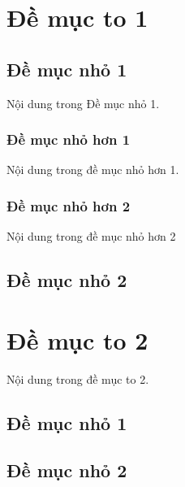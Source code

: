\documentclass[12pt]{article}
\begin{document}
    \tableofcontents
    \section{Đề mục to 1}
    \subsection{Đề mục nhỏ 1}
    Nội dung trong Đề mục nhỏ 1.
    \subsubsection{Đề mục nhỏ hơn 1}
    Nội dung trong đề mục nhỏ hơn 1.
    \subsubsection{Đề mục nhỏ hơn 2}
    Nội dung trong đề mục nhỏ hơn 2
    \subsection{Đề mục nhỏ 2}  
        \section{Đề mục to 2}
        Nội dung trong đề mục to 2.
        \subsection{Đề mục nhỏ 1}
        \subsection{Đề mục nhỏ 2}
\end{document}
